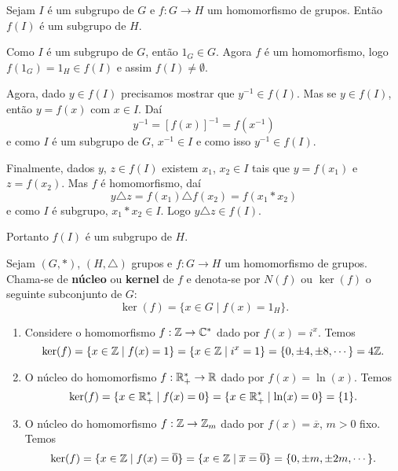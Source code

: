 \begin{proposicao}
    Sejam $I$ é um subgrupo de $G$ e $f : G \to H$ um homomorfismo de grupos. Então $f(I)$ é um subgrupo de $H$.
\end{proposicao}
\begin{prova}
    Como $I$ é um subgrupo de $G$, então $1_G \in G$. Agora $f$ é um homomorfismo, logo $f(1_G) = 1_H \in f(I)$ e assim $f(I) \ne \emptyset$.

    Agora, dado $y \in f(I)$ precisamos mostrar que $y^{-1} \in f(I)$. Mas se $y \in f(I)$, então $y = f(x)$ com $x \in I$. Daí
    \[
        y^{-1} = [f(x)]^{-1} = f(x^{-1})
    \]
    e como $I$ é um subgrupo de $G$, $x^{-1} \in I$ e como isso $y^{-1} \in f(I)$.

    Finalmente, dados $y$, $z \in f(I)$ existem $x_1$, $x_2 \in I$ tais que $y = f(x_1)$ e $z = f(x_2)$. Mas $f$ é homomorfismo, daí
    \[
        y\triangle z = f(x_1)\triangle f(x_2) = f(x_1*x_2)
    \]
    e como $I$ é subgrupo, $x_1*x_2 \in I$. Logo $y\triangle z \in f(I)$.

    Portanto $f(I)$ é um subgrupo de $H$.
\end{prova}

\begin{definicao}
    Sejam $(G, *)$, $(H, \triangle)$ grupos e $f : G \to H$ um homomorfismo de grupos. Chama-se de \textbf{núcleo} ou \textbf{kernel} de $f$ e denota-se por $N(f)$ ou $\ker(f)$ o seguinte subconjunto de $G$:
    \[
        \ker(f) = \{x \in G \mid f(x) = 1_H\}.
    \]
\end{definicao}

\begin{exemplos}
    \begin{enumerate}[label={\roman*})]
        \item Considere o homomorfismo $f : \mathbb{Z} \to \mathbb{C}^*$ dado por $f(x) = i^x$. Temos
        \[
            \ker(f) = \{x \in \mathbb{Z} \mid f(x) = 1\} = \{x \in \mathbb{Z} \mid i^x = 1\} = \{0, \pm 4, \pm 8, \cdots\} = 4\mathbb{Z}.
        \]

        \item O núcleo do homomorfismo $f : \mathbb{R}^*_+ \to \mathbb{R}$ dado por $f(x) = \ln(x)$. Temos
        \[
            \ker(f) = \{x \in \mathbb{R}^*_+ \mid f(x) = 0\} = \{x \in \mathbb{R}^*_+ \mid \ln(x) = 0\} = \{1\}.
        \]

        \item O núcleo do homomorfismo $f : \mathbb{Z} \to \mathbb{Z}_m$ dado por $f(x) = \overline{x}$, $m > 0$ fixo. Temos
        \[
            \ker(f) = \{x \in \mathbb{Z} \mid f(x) = \overline{0}\} = \{x \in \mathbb{Z} \mid \overline{x} = \overline{0}\} = \{0, \pm m, \pm 2m, \cdots\}.
        \]
    \end{enumerate}
\end{exemplos}

